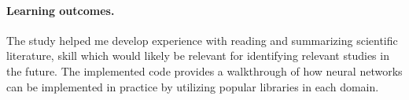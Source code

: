 \paragraph{Learning outcomes.}
The study helped me develop experience with reading and summarizing scientific literature, skill which
would likely be relevant for identifying relevant studies in the future.
The implemented code provides a walkthrough of how neural networks can be implemented in practice 
by utilizing popular libraries in each domain.

